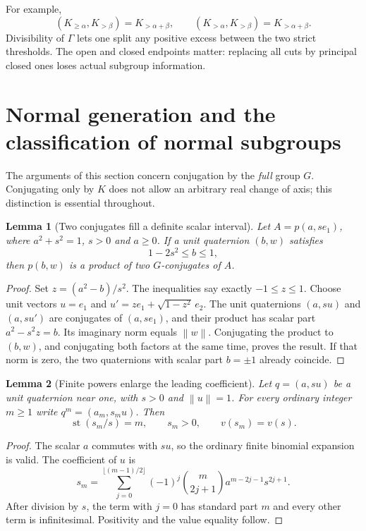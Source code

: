 \documentclass[11pt,letterpaper]{article}
\numberwithin{equation}{section}
\newtheorem{lemma}[lemma]{Lemma}
\theoremstyle{definition}
\theoremstyle{remark}
\newcommand{\st}{\operatorname{st}}
\newcommand{\norm}[1]{\left\lVert#1\right\rVert}
\newcommand{\comm}[2]{\left(#1,#2\right)}
\begin{document}
For example,
\[
 \comm{K_{\ge\alpha}}{K_{>\beta}}=K_{>\alpha+\beta},\qquad
 \comm{K_{>\alpha}}{K_{>\beta}}=K_{>\alpha+\beta}.
\]
Divisibility of $\Gamma$ lets one split any positive excess between the two
strict thresholds. The open and closed endpoints matter: replacing all cuts by
principal closed ones loses actual subgroup information.

\section{Normal generation and the classification of normal subgroups}\label{e3:cut:sec:normal}

The arguments of this section concern conjugation by the \emph{full} group
$G$. Conjugating only by $K$ does not allow an arbitrary real change of axis;
this distinction is essential throughout.

\begin{lemma}[Two conjugates fill a definite scalar interval]\label{e3:cut:lem:two}
Let $A=p(a,se_1)$, where $a^2+s^2=1$, $s>0$ and $a\ge0$. If a unit quaternion
$(b,w)$ satisfies
\begin{equation}\label{e3:cut:eq:twointerval}
 1-2s^2\le b\le1,
\end{equation}
then $p(b,w)$ is a product of two $G$-conjugates of $A$.
\end{lemma}
\begin{proof}
Set $z=(a^2-b)/s^2$. The inequalities say exactly $-1\le z\le1$. Choose unit
vectors $u=e_1$ and $u'=ze_1+\sqrt{1-z^2}\,e_2$. The unit quaternions
$(a,su)$ and $(a,su')$ are conjugates of $(a,se_1)$, and their product has
scalar part $a^2-s^2z=b$. Its imaginary norm equals $\norm w$. Conjugating the
product to $(b,w)$, and conjugating both factors at the same time, proves the
result. If that norm is zero, the two quaternions with scalar part $b=\pm1$
already coincide.
\end{proof}

\begin{lemma}[Finite powers enlarge the leading coefficient]\label{e3:cut:lem:powers}
Let $q=(a,su)$ be a unit quaternion near one, with $s>0$ and $\norm u=1$. For
every ordinary integer $m\ge1$ write $q^m=(a_m,s_mu)$. Then
\begin{equation}\label{e3:cut:eq:powers}
 \st(s_m/s)=m,\qquad s_m>0,\qquad v(s_m)=v(s).
\end{equation}
\end{lemma}
\begin{proof}
The scalar $a$ commutes with $su$, so the ordinary finite binomial expansion is
valid. The coefficient of $u$ is
\[
 s_m=\sum_{j=0}^{\lfloor(m-1)/2\rfloor}(-1)^j\binom m{2j+1}a^{m-2j-1}s^{2j+1}.
\]
After division by $s$, the term with $j=0$ has standard part $m$ and every other
term is infinitesimal. Positivity and the value equality follow.
\end{proof}
\end{document}
